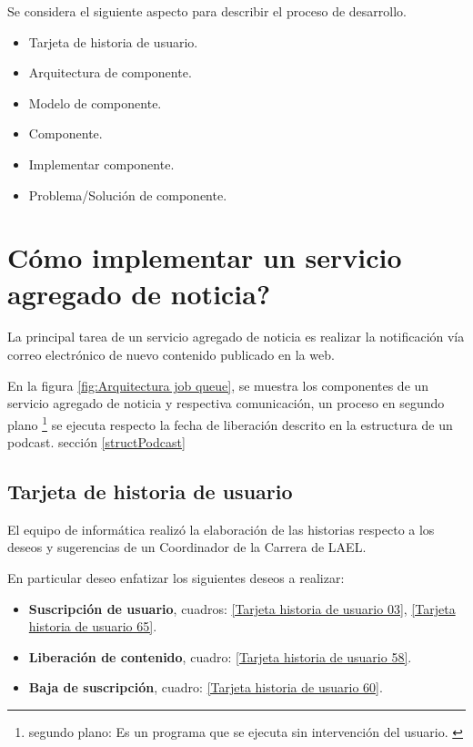 Se considera el siguiente aspecto para describir el proceso de desarrollo.

\begin{itemize}

\item Tarjeta de historia de usuario.
\item Arquitectura de componente.
\item Modelo de componente.
\item Componente.
\item Implementar componente.
\item Problema/Solución de componente.

\end{itemize}

\section{\textquestiondown Cómo implementar un servicio agregado de noticia?} \label{serviceFeed}

La principal tarea de un servicio agregado de noticia es realizar la
notificación vía correo electrónico de nuevo contenido publicado en la web.

En la figura \ref{fig:Arquitectura job queue}, se muestra los componentes de
un servicio agregado de noticia y respectiva comunicación, un proceso en
segundo plano \footnote{segundo plano: Es un programa que se ejecuta sin
intervención del usuario. \cite{background}} se ejecuta respecto la fecha
de liberación descrito en la estructura de un podcast. sección
\ref{structPodcast}

\begin{minipage}{1.0\textwidth}
	\centering
	\label{fig:Arquitectura job queue}
\end{minipage}

\subsection{Tarjeta de historia de usuario}

El equipo de informática realizó la elaboración de las historias respecto
a los deseos y sugerencias de un Coordinador de la Carrera de LAEL.

En particular deseo enfatizar los siguientes deseos a realizar:

\begin{itemize}

\item \textbf{Suscripción de usuario}, cuadros: \ref{Tarjeta historia de usuario 03},
\ref{Tarjeta historia de usuario 65}.
\item \textbf{Liberación de contenido}, cuadro: \ref{Tarjeta historia de usuario 58}.
\item \textbf{Baja de suscripción}, cuadro: \ref{Tarjeta historia de usuario 60}.

\end{itemize}

